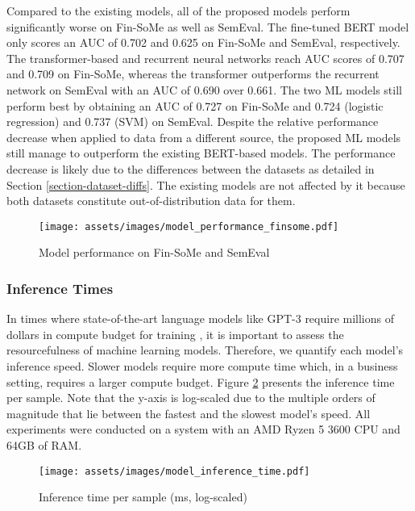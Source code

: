 Compared to the existing models, all of the proposed models perform significantly worse on Fin-SoMe as well as SemEval. The fine-tuned BERT model only scores an AUC of 0.702 and 0.625 on Fin-SoMe and SemEval, respectively. The transformer-based and recurrent neural networks reach AUC scores of 0.707 and 0.709 on Fin-SoMe, whereas the transformer outperforms the recurrent network on SemEval with an AUC of 0.690 over 0.661. The two ML models still perform best by obtaining an AUC of 0.727 on Fin-SoMe and 0.724 (logistic regression) and 0.737 (SVM) on SemEval. Despite the relative performance decrease when applied to data from a different source, the proposed ML models still manage to outperform the existing BERT-based models. The performance decrease is likely due to the differences between the datasets as detailed in Section \ref{section-dataset-diffs}. The existing models are not affected by it because both datasets constitute out-of-distribution data for them.

\begin{figure}[!ht]
	\texttt{[image: assets/images/model\_performance\_finsome.pdf]}	
	\caption{Model performance on Fin-SoMe and SemEval}
	\label{figure-model-performance-stocktwits}
\end{figure}



\subsubsection{Inference Times}
In times where state-of-the-art language models like GPT-3 require millions of dollars in compute budget for training \cite{gpt3-cost}, it is important to assess the resourcefulness of machine learning models. Therefore, we quantify each model's inference speed. Slower models require more compute time which, in a business setting, requires a larger compute budget. Figure \ref{figure-model-inference-times} presents the inference time per sample. Note that the y-axis is log-scaled due to the multiple orders of magnitude that lie between the fastest and the slowest model's speed. All experiments were conducted on a system with an AMD Ryzen 5 3600 CPU and 64GB of RAM.

\begin{figure}[!ht]
	\texttt{[image: assets/images/model\_inference\_time.pdf]}	
	\caption{Inference time per sample (ms, log-scaled)}
	\label{figure-model-inference-times}
\end{figure}

